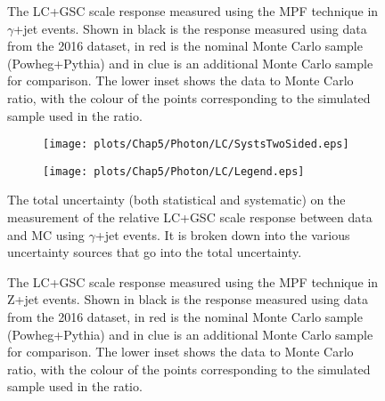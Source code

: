 \begin{figure}[!ht]
  \begin{center}
  \end{center}
  \caption[LC scale response using $\gamma$+jet in 2016]
  {\small The LC+GSC scale response measured using the MPF technique in $\gamma$+jet events.  Shown in black is the response measured using data from the 2016 dataset, in red is the nominal Monte Carlo sample (Powheg+Pythia) and in clue is an additional Monte Carlo sample for comparison.  The lower inset shows the data to Monte Carlo ratio, with the colour of the points corresponding to the simulated sample used in the ratio.  }
  \label{plot:GJetLC2016App}
\end{figure}

\begin{figure}[!ht]
\captionsetup[subfigure]{labelformat=empty}
 \begin{center}
   \begin{subfigure}{0.55\textwidth}
     \hspace{-3cm}
     \texttt{[image: plots/Chap5/Photon/LC/SystsTwoSided.eps]}
   \end{subfigure}
   \begin{subfigure}{0.55\textwidth}     \hspace{-3cm}
     \texttt{[image: plots/Chap5/Photon/LC/Legend.eps]}
   \end{subfigure}
 \end{center}
 \caption[Uncertainty on the LC+GSC scale response measurement using $\gamma$+jet]
 {\small The total uncertainty (both statistical and systematic) on the measurement of the relative LC+GSC scale response between data and MC using $\gamma$+jet events.  It is broken down into the various uncertainty sources that go into the total uncertainty.  }
 \label{Fig:GJetSystsLC2016}
\end{figure}

\begin{figure}[!ht]
  \begin{center}
  \end{center}
  \caption[LC scale response using Z+jet in 2016]
  {\small The LC+GSC scale response measured using the MPF technique in Z+jet events.  Shown in black is the response measured using data from the 2016 dataset, in red is the nominal Monte Carlo sample (Powheg+Pythia) and in clue is an additional Monte Carlo sample for comparison.  The lower inset shows the data to Monte Carlo ratio, with the colour of the points corresponding to the simulated sample used in the ratio.  }
  \label{plot:ZJetLC2016App}
\end{figure}

